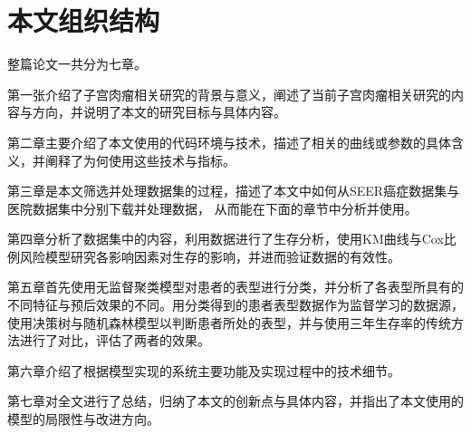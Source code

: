 \section{本文组织结构}

整篇论文一共分为七章。

第一张介绍了子宫肉瘤相关研究的背景与意义，阐述了当前子宫肉瘤相关研究的内容与方向，并说明了本文的研究目标与具体内容。

第二章主要介绍了本文使用的代码环境与技术，描述了相关的曲线或参数的具体含义，并阐释了为何使用这些技术与指标。

第三章是本文筛选并处理数据集的过程，描述了本文中如何从SEER癌症数据集与医院数据集中分别下载并处理数据，
从而能在下面的章节中分析并使用。

第四章分析了数据集中的内容，利用数据进行了生存分析，使用KM曲线与Cox比例风险模型研究各影响因素对生存的影响，并进而验证数据的有效性。

第五章首先使用无监督聚类模型对患者的表型进行分类，并分析了各表型所具有的不同特征与预后效果的不同。用分类得到的患者表型数据作为监督学习的数据源，使用决策树与随机森林模型以判断患者所处的表型，并与使用三年生存率的传统方法进行了对比，评估了两者的效果。

第六章介绍了根据模型实现的系统主要功能及实现过程中的技术细节。

第七章对全文进行了总结，归纳了本文的创新点与具体内容，并指出了本文使用的模型的局限性与改进方向。

